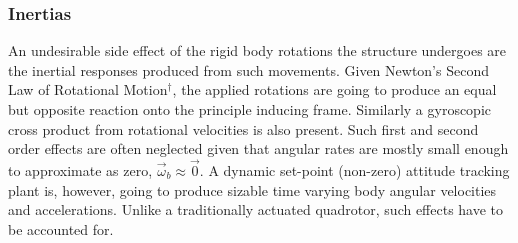 \subsubsection*{Inertias}
An undesirable side effect of the rigid body rotations the structure undergoes are the inertial responses produced from such movements. Given Newton's Second Law of Rotational Motion$^{\dagger}$, the applied rotations are going to produce an equal but opposite reaction onto the principle inducing frame. Similarly a gyroscopic cross product from rotational velocities is also present. Such first and second order effects are often neglected given that angular rates are mostly small enough to approximate as zero, $\vec{\omega}_b\approx\vec{0}$. A dynamic set-point (non-zero) attitude tracking plant is, however, going to produce sizable time varying body angular velocities and accelerations. Unlike a traditionally actuated quadrotor, such effects have to be accounted for.
